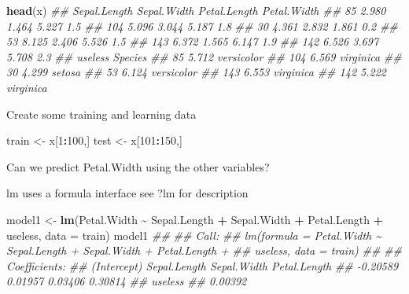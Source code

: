 \documentclass[
  notitlepage]{book}
\newenvironment{Shaded}{\begin{snugshade}}{\end{snugshade}}
\newcommand{\CommentTok}[1]{\textcolor[rgb]{0.56,0.35,0.01}{\textit{#1}}}
\newcommand{\DataTypeTok}[1]{\textcolor[rgb]{0.13,0.29,0.53}{#1}}
\newcommand{\DecValTok}[1]{\textcolor[rgb]{0.00,0.00,0.81}{#1}}
\newcommand{\KeywordTok}[1]{\textcolor[rgb]{0.13,0.29,0.53}{\textbf{#1}}}
\newcommand{\NormalTok}[1]{#1}
\newcommand{\OperatorTok}[1]{\textcolor[rgb]{0.81,0.36,0.00}{\textbf{#1}}}
\newcommand{\StringTok}[1]{\textcolor[rgb]{0.31,0.60,0.02}{#1}}
\begin{document}
\begin{Shaded}
\begin{Highlighting}[]
\KeywordTok{head}\NormalTok{(x)}
\CommentTok{\#\#     Sepal.Length Sepal.Width Petal.Length Petal.Width}
\CommentTok{\#\# 85         2.980       1.464        5.227         1.5}
\CommentTok{\#\# 104        5.096       3.044        5.187         1.8}
\CommentTok{\#\# 30         4.361       2.832        1.861         0.2}
\CommentTok{\#\# 53         8.125       2.406        5.526         1.5}
\CommentTok{\#\# 143        6.372       1.565        6.147         1.9}
\CommentTok{\#\# 142        6.526       3.697        5.708         2.3}
\CommentTok{\#\#     useless    Species}
\CommentTok{\#\# 85    5.712 versicolor}
\CommentTok{\#\# 104   6.569  virginica}
\CommentTok{\#\# 30    4.299     setosa}
\CommentTok{\#\# 53    6.124 versicolor}
\CommentTok{\#\# 143   6.553  virginica}
\CommentTok{\#\# 142   5.222  virginica}
\end{Highlighting}
\end{Shaded}

Create some training and learning data

\begin{Shaded}
\begin{Highlighting}[]
\NormalTok{train \textless{}{-}}\StringTok{ }\NormalTok{x[}\DecValTok{1}\OperatorTok{:}\DecValTok{100}\NormalTok{,]}
\NormalTok{test \textless{}{-}}\StringTok{ }\NormalTok{x[}\DecValTok{101}\OperatorTok{:}\DecValTok{150}\NormalTok{,]}
\end{Highlighting}
\end{Shaded}

Can we predict Petal.Width using the other variables?

lm uses a formula interface see ?lm for description

\begin{Shaded}
\begin{Highlighting}[]
\NormalTok{model1 \textless{}{-}}\StringTok{ }\KeywordTok{lm}\NormalTok{(Petal.Width }\OperatorTok{\textasciitilde{}}\StringTok{ }\NormalTok{Sepal.Length}
            \OperatorTok{+}\StringTok{ }\NormalTok{Sepal.Width }\OperatorTok{+}\StringTok{ }\NormalTok{Petal.Length }\OperatorTok{+}\StringTok{ }\NormalTok{useless,}
            \DataTypeTok{data =}\NormalTok{ train)}
\NormalTok{model1}
\CommentTok{\#\# }
\CommentTok{\#\# Call:}
\CommentTok{\#\# lm(formula = Petal.Width \textasciitilde{} Sepal.Length + Sepal.Width + Petal.Length + }
\CommentTok{\#\#     useless, data = train)}
\CommentTok{\#\# }
\CommentTok{\#\# Coefficients:}
\CommentTok{\#\#  (Intercept)  Sepal.Length   Sepal.Width  Petal.Length  }
\CommentTok{\#\#     {-}0.20589       0.01957       0.03406       0.30814  }
\CommentTok{\#\#      useless  }
\CommentTok{\#\#      0.00392}
\end{Highlighting}
\end{Shaded}
\end{document}
